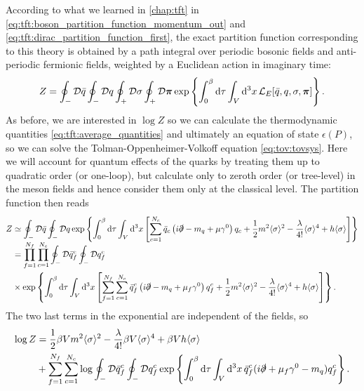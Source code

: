 According to what we learned in \cref{chap:tft} in \cref{eq:tft:boson_partition_function_momentum_out} and \eqref{eq:tft:dirac_partition_function_first},
the exact partition function corresponding to this theory is obtained by a path integral over periodic bosonic fields and anti-periodic fermionic fields, weighted by a Euclidean action in imaginary time:
\begin{equation}
	Z = \oint_- \mathcal{D} \bar{q} \oint_- \mathcal{D} q \oint_+ \mathcal{D} \sigma \oint_+ \mathcal{D} {\bm{\pi}} \exp \left\{ \int_0^\beta \mathop{}\!\mathrm{d} \tau \int_V \mathop{}\!\mathrm{d}^3 x \, \mathcal{L}_E[\bar{q}, q, \sigma, {\bm{\pi}}]  \right\} .
\end{equation}
As before, we are interested in $\log Z$ so we can calculate the thermodynamic quantities \eqref{eq:tft:average_quantities} and ultimately an equation of state $\epsilon(P)$, so we can solve the Tolman-Oppenheimer-Volkoff equation \eqref{eq:tov:tovsys}.
Here we will account for quantum effects of the quarks by treating them up to quadratic order (or one-loop),
but calculate only to zeroth order (or tree-level) in the meson fields and hence consider them only at the classical level.
The partition function then reads
\begin{equation}
\begin{split}
	Z &\simeq \oint_- \mathcal{D} \bar{q} \oint_- \mathcal{D} q \exp \left\{ \int_0^{\beta} \mathop{}\!\mathrm{d} \tau \int_V \mathop{}\!\mathrm{d}^3 x \left[ \sum_{c=1}^{N_c} \bar{q}_c \left( i \slashed\partial -m_q + \mu \gamma^0 \right) q_c + \frac12 m^2 \langle \sigma \rangle^2 - \frac{\lambda}{4!} \langle \sigma \rangle^4 + h \langle \sigma \rangle \right] \right\} \\
	  &=       \prod_{f=1}^{\smash{N_f}} \prod_{c=1}^{\smash{N_c}} \oint_- \mathcal{D} \bar{q}_f^c \oint_- \mathcal{D} q_f^c \\
	  &\times  \exp \left\{ \int_0^{\beta} \mathop{}\!\mathrm{d} \tau \int_V \mathop{}\!\mathrm{d}^3 x \left[ \sum_{f=1}^{\smash{N_f}} \sum_{c=1}^{N_c} \bar{q}_f^c \left( i \slashed\partial - m_q + \mu_f \gamma^0 \right) q_f^c + \frac12 m^2 \langle \sigma \rangle^2 - \frac{\lambda}{4!} \langle \sigma \rangle^4 + h \langle \sigma \rangle \right] \right\}.
\end{split}
\end{equation}
The two last terms in the exponential are independent of the fields, so
\begin{equation}
\begin{split}
	\log Z &= \frac12 \beta V m^2 \langle \sigma \rangle^2 - \frac{\lambda}{4!} \beta V \langle \sigma \rangle^4 + \beta V h \langle \sigma \rangle \\
	       &+ \sum_{f=1}^{N_f} \sum_{c=1}^{N_c} \log \oint_- \mathcal{D} \bar{q}_f^c \oint_- \mathcal{D} q_f^c \exp \left\{ \int_0^\beta \mathop{}\!\mathrm{d} \tau \int_V \mathop{}\!\mathrm{d}^3 x \, \bar{q}_f^c (i \slashed\partial + \mu_f \gamma^0 - m_q) q_f^c \right\} .
\end{split}
\end{equation}
